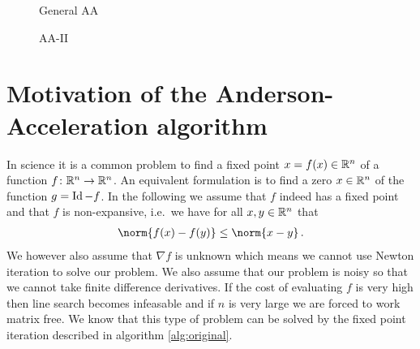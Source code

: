 \begin{figure}[h]
\centering
\begin{minipage}{0.41\textwidth}
\begin{algorithm}[H]
\caption{General AA}
\label{alg:aai}


\BlankLine
{}
\end{algorithm}
\end{minipage}
\hfill
\begin{minipage}{0.58\textwidth}
\begin{algorithm}[H]
\caption{AA-II}
\label{alg:aa2}

\BlankLine
{}
\end{algorithm}
\end{minipage}
\end{figure}


\section{Motivation of the Anderson-Acceleration algorithm}

In science it is a common problem to find a fixed point $x=f(x)\in\mathbb{R}^n$ of a function $f\colon\mathbb{R}^n\to\mathbb{R}^n$. An equivalent formulation is to find a zero $x\in\mathbb{R}^n$ of the function $g=\operatorname{Id}-f$. In the following we assume that $f$ indeed has a fixed point and that $f$ is non-expansive, i.e.\ we have for all $x,y\in\mathbb{R}^n$ that
\begin{align*}
	\norm{f(x)-f(y)}\leq\norm{x-y}\,.
\end{align*}
We however also assume that $\nabla f$ is unknown which means we cannot use Newton iteration to solve our problem. We also assume that our problem is noisy so that we cannot take finite difference derivatives. If the cost of evaluating $f$ is very high then line search becomes infeasable and if $n$ is very large we are forced to work matrix free. We know that this type of problem can be solved by the fixed point iteration described in algorithm \ref{alg:original}.

